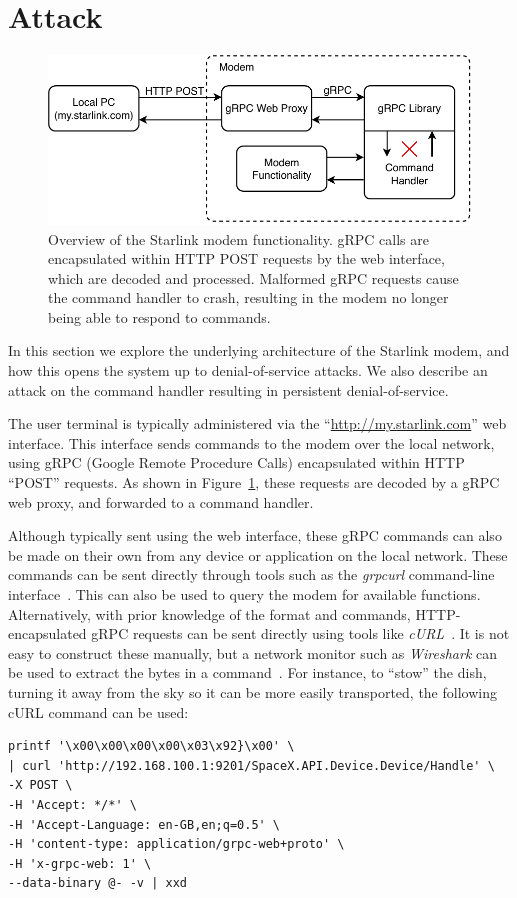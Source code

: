 \section{Attack}\label{sec:attack}

\begin{figure}
    \centering\includegraphics[width=\columnwidth]{img/modem.pdf}
    \caption{Overview of the Starlink modem functionality. gRPC calls are encapsulated within HTTP POST requests by the web interface, which are decoded and processed. Malformed gRPC requests cause the command handler to crash, resulting in the modem no longer being able to respond to commands.}
    \label{fig:modem}
\end{figure}

In this section we explore the underlying architecture of the Starlink modem, and how this opens the system up to denial-of-service attacks.
We also describe an attack on the command handler resulting in persistent denial-of-service.

The user terminal is typically administered via the ``\url{http://my.starlink.com}'' web interface.
This interface sends commands to the modem over the local network, using gRPC (Google Remote Procedure Calls) encapsulated within HTTP ``POST'' requests.
As shown in Figure~\ref{fig:modem}, these requests are decoded by a gRPC web proxy, and forwarded to a command handler.

Although typically sent using the web interface, these gRPC commands can also be made on their own from any device or application on the local network.
These commands can be sent directly through tools such as the \textit{grpcurl} command-line interface~\cite{gRPCurl}.
This can also be used to query the modem for available functions.
Alternatively, with prior knowledge of the format and commands, HTTP-encapsulated gRPC requests can be sent directly using tools like \textit{cURL}~\cite{cURL}.
It is not easy to construct these manually, but a network monitor such as \textit{Wireshark} can be used to extract the bytes in a command~\cite{wireshark}.
For instance, to ``stow'' the dish, turning it away from the sky so it can be more easily transported, the following cURL command can be used:
\begin{lstlisting}
printf '\x00\x00\x00\x00\x03\x92}\x00' \
| curl 'http://192.168.100.1:9201/SpaceX.API.Device.Device/Handle' \
-X POST \
-H 'Accept: */*' \
-H 'Accept-Language: en-GB,en;q=0.5' \
-H 'content-type: application/grpc-web+proto' \
-H 'x-grpc-web: 1' \
--data-binary @- -v | xxd
\end{lstlisting}

